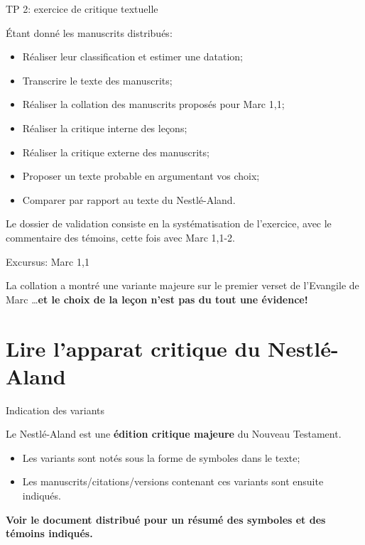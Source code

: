 \documentclass[11pt]{beamer}
\begin{document}
\begin{frame}{TP 2: exercice de critique textuelle}
    \begin{block}{}
        Étant donné les manuscrits distribués:
        \begin{itemize}
            \item Réaliser leur classification et estimer une datation;
            \item Transcrire le texte des manuscrits;
            \item Réaliser la collation des manuscrits proposés pour Marc 1,1;
            \item Réaliser la critique interne des leçons;
            \item Réaliser la critique externe des manuscrits;
            \item Proposer un texte probable en argumentant vos choix;
            \item Comparer par rapport au texte du Nestlé-Aland.
        \end{itemize}
    \end{block}
    \begin{alertblock}{}
        Le dossier de validation consiste en la systématisation de l'exercice, avec le commentaire des témoins, cette fois avec Marc 1,1-2.
    \end{alertblock}
\end{frame}


\begin{frame}{Excursus: Marc 1,1}
    \begin{alertblock}{}
La collation a montré une variante majeure sur le premier verset de l'Evangile de Marc \dots \textbf{et le choix de la leçon n'est pas du tout une évidence!}
    \end{alertblock}
\end{frame}


\section{Lire l'apparat critique du Nestlé-Aland}

\begin{frame}{Indication des variants}
    \begin{alertblock}{}
Le Nestlé-Aland est une \textbf{édition critique majeure} du Nouveau Testament.
    \end{alertblock}
    \pause
    \begin{itemize}
        \item Les variants sont notés sous la forme de symboles dans le texte;
        \item Les manuscrits/citations/versions contenant ces variants sont ensuite indiqués.
    \end{itemize}
    \textbf{Voir le document distribué pour un résumé des symboles et des témoins indiqués.}
\end{frame}
\end{document}
